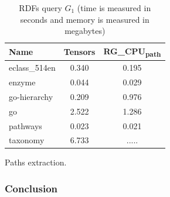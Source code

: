 {\setlength{\tabcolsep}{0.4em}
	\begin{table}
		\caption{RDFs query $G_1$ (time is measured in seconds and memory is measured in megabytes)}
		\label{tbl:tableRDFQ1_appendix}
		\begin{tabular}{| l | c | c |}
			\hline
			
			Name            & Tensors & RG\_CPU\textsubscript{path}	 \\
			\hline
			\hline
			eclass\_514en   & 0.340   & 0.195   \\
			enzyme          & 0.044   & 0.029   \\
			go-hierarchy    & 0.209   & 0.976   \\
			go              & 2.522   & 1.286   \\
			pathways        & 0.023   & 0.021   \\
			taxonomy        & 6.733   & .....   \\
			\hline
		\end{tabular}
	\end{table}
}


Paths extraction.

\subsubsection{Conclusion}
